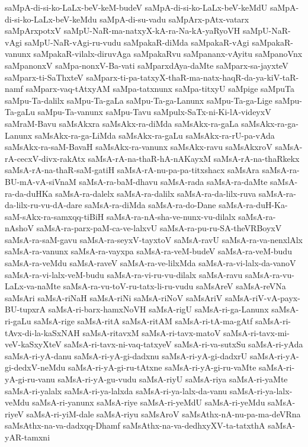 {saMpA-di-si-ko-LaLx-beV-keM-budeV
saMpA-di-si-ko-LaLx-beV-keMdU
saMpA-di-si-ko-LaLx-beV-keMdu
saMpA-di-su-vadu
saMpArx-pAtx-vatarx
saMpArxpotxV
saMpU-NaR-ma-natxyX-kA-ra-Na-kA-yaRyoVH
saMpU-NaR-vAgi
saMpU-NaR-vAgi-ru-vudu
saMpakaR-diMda
saMpakaR-vAgi
saMpakaR-vanunx
saMpakaR-vilalx-diruvAga
saMpakaRvu
saMpananx-vAyitu
saMpanoVnx
saMpanonxV
saMpa-nonxV-Ba-vati
saMparxdAya-daMte
saMparx-sa-jayxteV
saMparx-ti-SaThxteV
saMparx-ti-pa-tatxyX-thaR-ma-natx-haqR-da-ya-kiV-taR-namf
saMparx-vaq-tAtxyAM
saMpa-tatxnunx
saMpa-titxyU
saMpige
saMpuTa
saMpu-Ta-dalilx
saMpu-Ta-gaLa
saMpu-Ta-ga-Lanunx
saMpu-Ta-ga-Lige
saMpu-Ta-gaLu
saMpu-Ta-vanunx
saMpu-Tavu
saMpulx-SaTx-ni-Ki-lA-videyxV
saMraM-Bavu
saMsAkxra
saMsAkx-ra-diMda
saMsAkx-ra-gaLa
saMsAkx-ra-ga-Lanunx
saMsAkx-ra-ga-LiMda
saMsAkx-ra-gaLu
saMsAkx-ra-rU-pa-vAda
saMsAkx-ra-saM-BavaH
saMsAkx-ra-vanunx
saMsAkx-ravu
saMsAkxroV
saMsA-rA-cecxV-divx-rakAtx
saMsA-rA-na-thaR-hA-nAKayxM
saMsA-rA-na-thaRkekx
saMsA-rA-na-thaR-saM-gatiH
saMsA-rA-nu-pa-pa-titxshacx
saMsAra
saMsA-ra-BU-mA-vA-siVnaM
saMsA-ra-baM-dhavu
saMsA-rada
saMsA-ra-daMte
saMsA-ra-da-duHKa
saMsA-ra-dalelx
saMsA-ra-dalilx
saMsA-ra-da-lilx-ruva
saMsA-ra-da-lilx-ru-vu-dA-dare
saMsA-ra-diMda
saMsA-ra-do-Dane
saMsA-ra-duH-Ka-saM-sAkx-ra-samxqq-tiBiH
saMsA-ra-nA-sha-ve-nunx-vu-dilalx
saMsA-ra-nAshoV
saMsA-ra-parx-paM-ca-ve-lalxvU
saMsA-ra-pu-ru-SA-theVRBoyxV
saMsA-ra-saM-gavu
saMsA-ra-seyxV-tayxtoV
saMsA-ravU
saMsA-ra-va-nenxlAlx
saMsA-ra-vanunx
saMsA-ra-vayxpa
saMsA-ra-veM-budeV
saMsA-ra-veM-budu
saMsA-ra-veMdu
saMsA-raveV
saMsA-ra-ve-lilxMda
saMsA-ra-vi-lalx-da-vanoV
saMsA-ra-vi-lalx-veM-budu
saMsA-ra-vi-ru-vu-dilalx
saMsA-ravu
saMsA-ra-vu-LaLx-va-naMte
saMsA-ra-vu-toV-ru-tatx-li-ru-vudu
saMsAreV
saMsA-reVNa
saMsAri
saMsA-riNaH
saMsA-riNi
saMsA-riNoV
saMsAriV
saMsA-riV-vA-payx-BU-tupxrA
saMsA-ri-barx-hamxNoVH
saMsA-rigU
saMsA-ri-ga-Lanunx
saMsA-ri-gaLu
saMsA-rige
saMsA-ritA
saMsA-ritAM
saMsA-ri-tA-ma-gAtf
saMsA-ri-tAvx-di-la-kaSxNAH
saMsA-ritavxM
saMsA-ri-tavx-matoV
saMsA-ri-tavx-mi-veV-kaSxyXteV
saMsA-ri-tavx-ni-vaq-tatxyeV
saMsA-ri-va-sutxSu
saMsA-ri-yAda
saMsA-ri-yA-danu
saMsA-ri-yA-gi-dadxnu
saMsA-ri-yA-gi-dadxrU
saMsA-ri-yA-gi-dedxV-neMdu
saMsA-ri-yA-gi-ru-tAtxne
saMsA-ri-yA-gi-ru-vaMte
saMsA-ri-yA-gi-ru-vanu
saMsA-ri-yA-gu-vudu
saMsA-riyU
saMsA-riya
saMsA-ri-yaMte
saMsA-ri-yalalx
saMsA-ri-ya-lalxda
saMsA-ri-ya-lalx-da-vanu
saMsA-ri-ya-lalx-veMdu
saMsA-ri-yanunx
saMsA-riye
saMsA-ri-yeMdU
saMsA-ri-yeMdu
saMsA-riyeV
saMsA-ri-yiM-dale
saMsA-riyu
saMsAroV
saMsAthx-nA-nu-pa-ma-deVRna
saMsAthx-na-va-dadxqq-Dhamf
saMsAthx-na-va-dedhxyXV-ta-tatxthA
saMsA-yAR-tamxni
}
